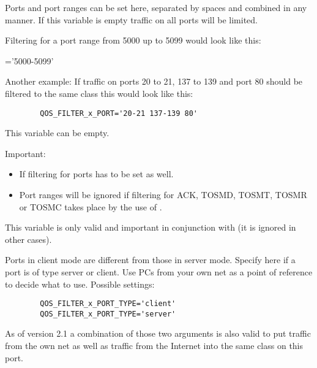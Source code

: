 \begin{description}
   \sloppypar{}


   Ports and port ranges can be set here, separated by spaces and combined in
   any manner. If this variable is empty traffic on all ports will be limited.

   Filtering for a port range from 5000 up to 5099 would look like this:

='5000-5099'

   Another example:
   If traffic on ports 20 to 21, 137 to 139 and port 80 should be filtered
   to the same class this would look like this:

\begin{example}
\begin{verbatim}
        QOS_FILTER_x_PORT='20-21 137-139 80'
\end{verbatim}
\end{example}

   This variable can be empty.

   Important:
   \begin{itemize}
   \item  If filtering for ports 
   has to be set as well.


   \item Port ranges will be ignored if filtering for ACK, TOSMD, TOSMT, TOSMR
   or TOSMC takes place by the use of .
   \end{itemize}



   This variable is only valid and important in conjunction with
    (it is ignored in other cases).

   Ports in client mode are different from those in server mode. Specify
   here if a port is of type server or client. Use PCs from your own net
   as a point of reference to decide what to use.
   Possible settings:

\begin{example}
\begin{verbatim}
        QOS_FILTER_x_PORT_TYPE='client'
        QOS_FILTER_x_PORT_TYPE='server'
\end{verbatim}
\end{example}
   As of version 2.1 a combination of those two arguments is also valid to
   put traffic from the own net as well as traffic from the Internet into
   the same class on this port.


\end{description}
